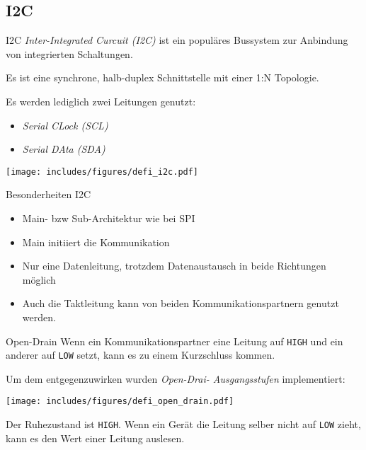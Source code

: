 \subsection{I2C}

\begin{defi}{I2C}
    \emph{Inter-Integrated Curcuit (I2C)} ist ein populäres Bussystem zur Anbindung von integrierten Schaltungen.

    Es ist eine synchrone, halb-duplex Schnittstelle mit einer 1:N Topologie.

    Es werden lediglich zwei Leitungen genutzt:
    \begin{itemize}
        \item \emph{Serial CLock (SCL)}
        \item \emph{Serial DAta (SDA)}
    \end{itemize}

    \texttt{[image: includes/figures/defi\_i2c.pdf]}
\end{defi}

\begin{bonus}{Besonderheiten I2C}
    \begin{itemize}
        \item Main- bzw Sub-Architektur wie bei SPI
        \item Main initiiert die Kommunikation
        \item Nur eine Datenleitung, trotzdem Datenaustausch in beide Richtungen möglich
        \item Auch die Taktleitung kann von beiden Kommunikationspartnern genutzt werden.
    \end{itemize}
\end{bonus}

\begin{defi}{Open-Drain}
    Wenn ein Kommunikationspartner eine Leitung auf \texttt{HIGH} und ein anderer auf \texttt{LOW} setzt, kann es zu einem Kurzschluss kommen.

    Um dem entgegenzuwirken wurden \emph{Open-Drai- Ausgangsstufen} implementiert:

    \begin{center}
        \texttt{[image: includes/figures/defi\_open\_drain.pdf]}
    \end{center}

    Der Ruhezustand ist \texttt{HIGH}.
    Wenn ein Gerät die Leitung selber nicht auf \texttt{LOW} zieht, kann es den Wert einer Leitung auslesen.
\end{defi}


